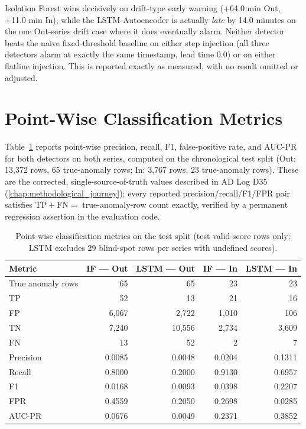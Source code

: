 \documentclass[11pt,a4paper,oneside]{report}
\begin{document}
\begin{keyfinding}
Isolation Forest wins decisively on drift-type early warning (+64.0 min Out, +11.0 min In), while the LSTM-Autoencoder is actually \emph{late} by 14.0 minutes on the one Out-series drift case where it does eventually alarm. Neither detector beats the naive fixed-threshold baseline on either step injection (all three detectors alarm at exactly the same timestamp, lead time 0.0) or on either flatline injection. This is reported exactly as measured, with no result omitted or adjusted.
\end{keyfinding}

\section{Point-Wise Classification Metrics}
\label{sec:res_pointwise}

Table~\ref{tab:pointwise} reports point-wise precision, recall, F1, false-positive rate, and AUC-PR for both detectors on both series, computed on the chronological test split (Out: 13,372 rows, 65 true-anomaly rows; In: 3,767 rows, 23 true-anomaly rows). These are the corrected, single-source-of-truth values described in AD Log D35 (\cref{chap:methodological_journey}); every reported precision/recall/F1/FPR pair satisfies $\text{TP}+\text{FN} = $ true-anomaly-row count exactly, verified by a permanent regression assertion in the evaluation code.

\begin{table}[H]
\centering
\caption{Point-wise classification metrics on the test split (test valid-score rows only; LSTM excludes 29 blind-spot rows per series with undefined scores).}
\label{tab:pointwise}
\small
\begin{tabular}{lrrrr}
\toprule
\textbf{Metric} & \textbf{IF --- Out} & \textbf{LSTM --- Out} & \textbf{IF --- In} & \textbf{LSTM --- In} \\
\midrule
True anomaly rows & 65 & 65 & 23 & 23 \\
TP & 52 & 13 & 21 & 16 \\
FP & 6,067 & 2,722 & 1,010 & 106 \\
TN & 7,240 & 10,556 & 2,734 & 3,609 \\
FN & 13 & 52 & 2 & 7 \\
\midrule
Precision & 0.0085 & 0.0048 & 0.0204 & 0.1311 \\
Recall & 0.8000 & 0.2000 & 0.9130 & 0.6957 \\
F1 & 0.0168 & 0.0093 & 0.0398 & 0.2207 \\
FPR & 0.4559 & 0.2050 & 0.2698 & 0.0285 \\
AUC-PR & 0.0676 & 0.0049 & 0.2371 & 0.3852 \\
\bottomrule
\end{tabular}
\end{table}
\end{document}
